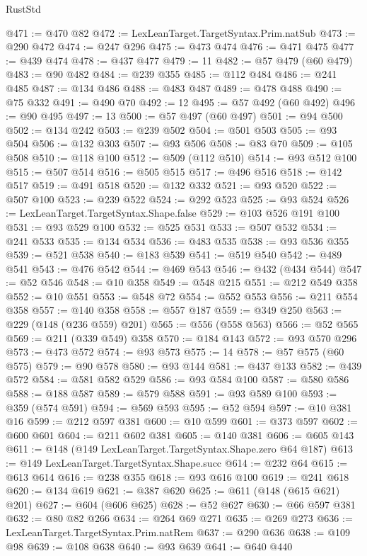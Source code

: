 \begin{lexlean}{RustStd}
\begin{coremodule}
@471 := @470 @82
@472 := LexLeanTarget.TargetSyntax.Prim.natSub
@473 := @290 @472
@474 := @247 @296
@475 := @473 @474
@476 := @471 @475
@477 := @439 @474
@478 := @437 @477
@479 := 11
@482 := @57 @479 (@60 @479)
@483 := @90 @482
@484 := @239 @355
@485 := @112 @484
@486 := @241 @485
@487 := @134 @486
@488 := @483 @487
@489 := @478 @488
@490 := @75 @332
@491 := @490 @70
@492 := 12
@495 := @57 @492 (@60 @492)
@496 := @90 @495
@497 := 13
@500 := @57 @497 (@60 @497)
@501 := @94 @500
@502 := @134 @242
@503 := @239 @502
@504 := @501 @503
@505 := @93 @504
@506 := @132 @303
@507 := @93 @506
@508 := @83 @70
@509 := @105 @508
@510 := @118 @100
@512 := @509 (@112 @510)
@514 := @93 @512 @100
@515 := @507 @514
@516 := @505 @515
@517 := @496 @516
@518 := @142 @517
@519 := @491 @518
@520 := @132 @332
@521 := @93 @520
@522 := @507 @100
@523 := @239 @522
@524 := @292 @523
@525 := @93 @524
@526 := LexLeanTarget.TargetSyntax.Shape.false
@529 := @103 @526 @191 @100
@531 := @93 @529 @100
@532 := @525 @531
@533 := @507 @532
@534 := @241 @533
@535 := @134 @534
@536 := @483 @535
@538 := @93 @536 @355
@539 := @521 @538
@540 := @183 @539
@541 := @519 @540
@542 := @489 @541
@543 := @476 @542
@544 := @469 @543
@546 := @432 (@434 @544)
@547 := @52 @546
@548 := @10 @358
@549 := @548 @215
@551 := @212 @549 @358
@552 := @10 @551
@553 := @548 @72
@554 := @552 @553
@556 := @211 @554 @358
@557 := @140 @358
@558 := @557 @187
@559 := @349 @250
@563 := @229 (@148 (@236 @559) @201)
@565 := @556 (@558 @563)
@566 := @52 @565
@569 := @211 (@339 @549) @358
@570 := @184 @143
@572 := @93 @570 @296
@573 := @473 @572
@574 := @93 @573
@575 := 14
@578 := @57 @575 (@60 @575)
@579 := @90 @578
@580 := @93 @144
@581 := @437 @133
@582 := @439 @572
@584 := @581 @582 @529
@586 := @93 @584 @100
@587 := @580 @586
@588 := @188 @587
@589 := @579 @588
@591 := @93 @589 @100
@593 := @359 (@574 @591)
@594 := @569 @593
@595 := @52 @594
@597 := @10 @381 @16
@599 := @212 @597 @381
@600 := @10 @599
@601 := @373 @597
@602 := @600 @601
@604 := @211 @602 @381
@605 := @140 @381
@606 := @605 @143
@611 := @148 (@149 LexLeanTarget.TargetSyntax.Shape.zero @64 @187)
@613 := @149 LexLeanTarget.TargetSyntax.Shape.succ
@614 := @232 @64
@615 := @613 @614
@616 := @238 @355
@618 := @93 @616 @100
@619 := @241 @618
@620 := @134 @619
@621 := @387 @620
@625 := @611 (@148 (@615 @621) @201)
@627 := @604 (@606 @625)
@628 := @52 @627
@630 := @66 @597 @381
@632 := @80 @82 @266
@634 := @264 @69 @271
@635 := @269 @273
@636 := LexLeanTarget.TargetSyntax.Prim.natRem
@637 := @290 @636
@638 := @109 @98
@639 := @108 @638
@640 := @93 @639
@641 := @640 @440

\end{coremodule}
\end{lexlean}
